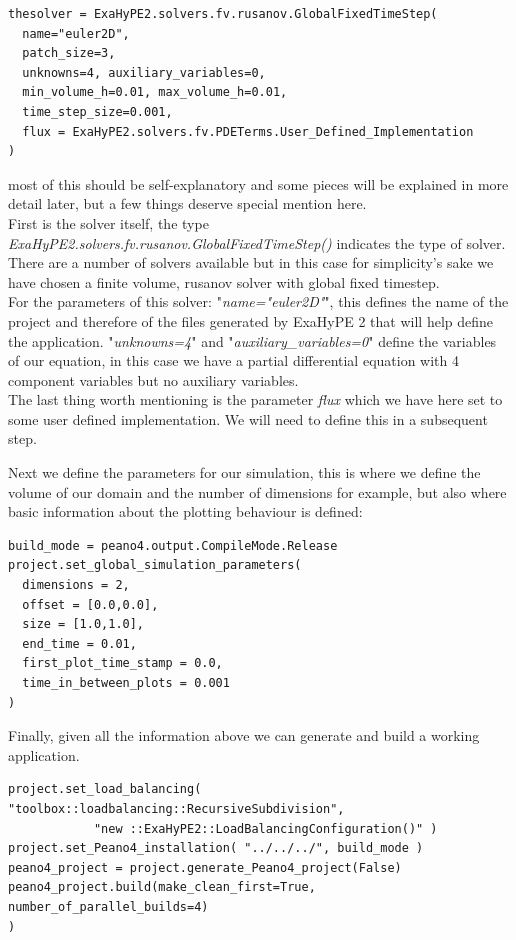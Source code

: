 \documentclass[12pt,letterpaper]{article}
\begin{document}
\begin{lstlisting}[style = Python]
thesolver = ExaHyPE2.solvers.fv.rusanov.GlobalFixedTimeStep(
  name="euler2D",
  patch_size=3,
  unknowns=4, auxiliary_variables=0,
  min_volume_h=0.01, max_volume_h=0.01,
  time_step_size=0.001,
  flux = ExaHyPE2.solvers.fv.PDETerms.User_Defined_Implementation
)
\end{lstlisting}

most of this should be self-explanatory and some pieces will be explained in more detail later, but a few things deserve special mention here.\\
First is the solver itself, the type \textit{ExaHyPE2.solvers.fv.rusanov.GlobalFixedTimeStep()} indicates the type of solver. There are a number of solvers available but in this case for simplicity's sake we have chosen a finite volume, rusanov solver with global fixed timestep.\\
For the parameters of this solver: "\textit{name="euler2D"}", this defines the name of the project and therefore of the files generated by ExaHyPE 2 that will help define the application. "\textit{unknowns=4}" and "\textit{auxiliary\_variables=0}" define the variables of our equation, in this case we have a partial differential equation with 4 component variables but no auxiliary variables.\\ 
The last thing worth mentioning is the parameter \textit{flux} which we have here set to some user defined implementation. We will need to define this in a subsequent step.
\newpage

Next we define the parameters for our simulation, this is where we define the volume of our domain and the number of dimensions for example, but also where basic information about the plotting behaviour is defined:
\begin{lstlisting}[style = Python]
build_mode = peano4.output.CompileMode.Release
project.set_global_simulation_parameters(
  dimensions = 2,
  offset = [0.0,0.0],
  size = [1.0,1.0],
  end_time = 0.01,
  first_plot_time_stamp = 0.0,
  time_in_between_plots = 0.001
)\end{lstlisting}

Finally, given all the information above we can generate and build a working application.

\begin{lstlisting}[style = Python]
project.set_load_balancing( "toolbox::loadbalancing::RecursiveSubdivision", 
            "new ::ExaHyPE2::LoadBalancingConfiguration()" )
project.set_Peano4_installation( "../../../", build_mode )
peano4_project = project.generate_Peano4_project(False)
peano4_project.build(make_clean_first=True, number_of_parallel_builds=4)
)\end{lstlisting}
\end{document}
